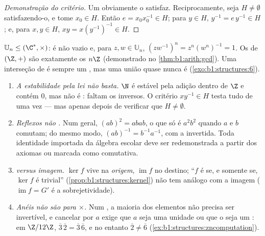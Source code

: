 \begin{proof}[Demonstração do critério]
Um  obviamente o satisfaz. Reciprocamente, seja $H \neq \emptyset$
satisfazendo-o, e tome $x_0 \in H$. Então $e = x_0 x_0^{-1} \in H$; para
$y \in H$, $y^{-1} = e\,y^{-1} \in H$; e, para $x, y \in H$, $xy =
x (y^{-1})^{-1} \in H$.
\end{proof}

\begin{example}\label{ex:b1:structures:subgroups}
$\mathbb{U}_n \leq (\C^*, \times)$: é não vazio e, para $z, w \in
\mathbb{U}_n$, $(zw^{-1})^n = z^n (w^n)^{-1} = 1$. Os  de
$(\Z, +)$ são exatamente os $n\Z$ (demonstrado no
\cref{thm:b1:arith:gcd}). Uma interseção de  é sempre um
, mas uma união quase nunca é
(\cref{exo:b1:structures:6}).
\end{example}

\begin{remark}\label{rem:b1:structures:pitfalls}
\begin{enumerate}
  \item \emph{A estabilidade pela lei não basta.} $\N$ é
        estável pela adição dentro de $\Z$ e contém $0$, mas não
        é : faltam os inversos. O critério
        $xy^{-1} \in H$ testa tudo de uma vez --- mas apenas
        depois de verificar que $H \neq \emptyset$.
  \item \emph{Reflexos não .} Num  geral, $(ab)^2 =
        abab$, o que só é $a^2b^2$ quando $a$ e $b$ comutam;
        do mesmo modo, $(ab)^{-1} = b^{-1}a^{-1}$, com a  invertida.
        Toda identidade importada da álgebra escolar deve ser
        redemonstrada a partir dos axiomas ou marcada como comutativa.
  \item \emph{ versus imagem.} $\ker f$ vive na
        \emph{origem}, $\operatorname{im} f$ no destino;
        ``$f$ é  se, e somente se, $\ker f$ é trivial''
        (\cref{prop:b1:structures:kernel}) não tem análogo com
        a imagem ($\operatorname{im} f = G'$ é a sobrejetividade).
  \item \emph{Anéis não são  para $\times$.} Num , a maioria
        dos elementos não precisa ser invertível, e cancelar por $a$
        exige que $a$ seja uma unidade ou que o  seja um : em $\Z/12\Z$, $\overline3\,\overline2 =
        \overline3\,\overline6$, e no entanto $\overline2 \neq \overline6$
        (\cref{ex:b1:structures:zncomputation}).
\end{enumerate}
\end{remark}

